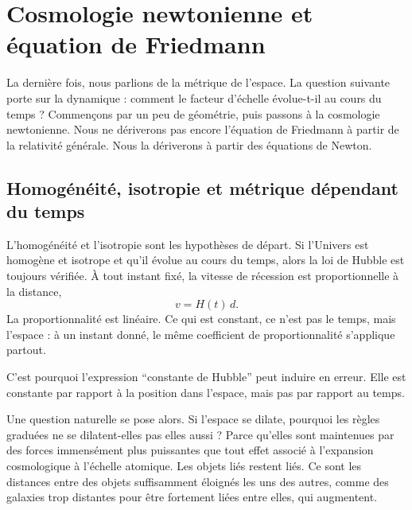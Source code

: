 \chapter{Cosmologie newtonienne et équation de Friedmann}

La dernière fois, nous parlions de la métrique de l’espace. La question suivante porte sur la dynamique : comment le facteur d’échelle évolue-t-il au cours du temps ? Commençons par un peu de géométrie, puis passons à la cosmologie newtonienne. Nous ne dériverons pas encore l’équation de Friedmann à partir de la relativité générale. Nous la dériverons à partir des équations de Newton.

\section{Homogénéité, isotropie et métrique dépendant du temps}

L’homogénéité et l’isotropie sont les hypothèses de départ. Si l’Univers est homogène et isotrope et qu’il évolue au cours du temps, alors la loi de Hubble est toujours vérifiée. À tout instant fixé, la vitesse de récession est proportionnelle à la distance,
\begin{equation}
v = H(t)\,d.
\end{equation}
La proportionnalité est linéaire. Ce qui est constant, ce n’est pas le temps, mais l’espace : à un instant donné, le même coefficient de proportionnalité s’applique partout.

\begin{classroomqa}
\end{classroomqa}

C’est pourquoi l’expression ``constante de Hubble'' peut induire en erreur. Elle est constante par rapport à la position dans l’espace, mais pas par rapport au temps.

Une question naturelle se pose alors. Si l’espace se dilate, pourquoi les règles graduées ne se dilatent-elles pas elles aussi ? Parce qu’elles sont maintenues par des forces immensément plus puissantes que tout effet associé à l’expansion cosmologique à l’échelle atomique. Les objets liés restent liés. Ce sont les distances entre des objets suffisamment éloignés les uns des autres, comme des galaxies trop distantes pour être fortement liées entre elles, qui augmentent.

